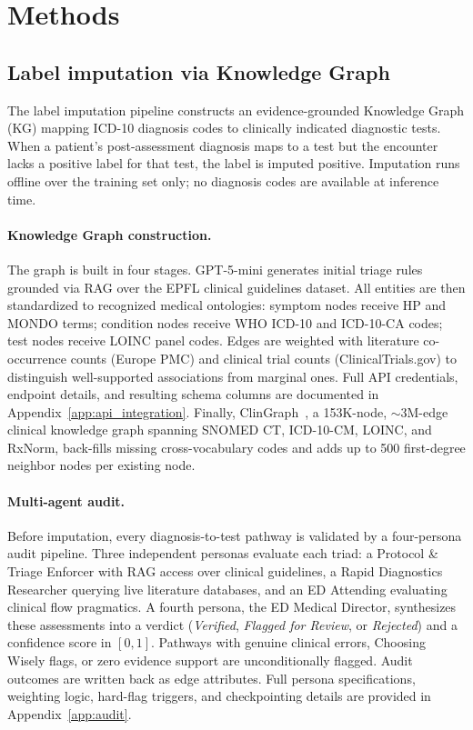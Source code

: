 \newpage
\section[Methods]{Methods\footnotemark}

\subsection{Label imputation via Knowledge Graph}

The label imputation pipeline constructs an evidence-grounded Knowledge Graph (KG) mapping ICD-10 diagnosis codes to clinically indicated diagnostic tests. When a patient's post-assessment diagnosis maps to a test but the encounter lacks a positive label for that test, the label is imputed positive. Imputation runs offline over the training set only; no diagnosis codes are available at inference time.

\paragraph{Knowledge Graph construction.}
The graph is built in four stages. GPT-5-mini generates initial triage rules grounded via RAG over the EPFL clinical guidelines dataset. All entities are then standardized to recognized medical ontologies: symptom nodes receive HP and MONDO terms; condition nodes receive WHO ICD-10 and ICD-10-CA codes; test nodes receive LOINC panel codes. Edges are weighted with literature co-occurrence counts (Europe PMC) and clinical trial counts (ClinicalTrials.gov) to distinguish well-supported associations from marginal ones. Full API credentials, endpoint details, and resulting schema columns are documented in Appendix~\ref{app:api_integration}. Finally, ClinGraph~\cite{johnson_clinvec_2024}, a 153K-node, ${\sim}$3M-edge clinical knowledge graph spanning SNOMED CT, ICD-10-CM, LOINC, and RxNorm, back-fills missing cross-vocabulary codes and adds up to 500 first-degree neighbor nodes per existing node.

\paragraph{Multi-agent audit.}
Before imputation, every diagnosis-to-test pathway is validated by a four-persona audit pipeline. Three independent personas evaluate each triad: a Protocol \& Triage Enforcer with RAG access over clinical guidelines, a Rapid Diagnostics Researcher querying live literature databases, and an ED Attending evaluating clinical flow pragmatics. A fourth persona, the ED Medical Director, synthesizes these assessments into a verdict (\textit{Verified}, \textit{Flagged for Review}, or \textit{Rejected}) and a confidence score in $[0, 1]$. Pathways with genuine clinical errors, Choosing Wisely flags, or zero evidence support are unconditionally flagged. Audit outcomes are written back as edge attributes. Full persona specifications, weighting logic, hard-flag triggers, and checkpointing details are provided in Appendix~\ref{app:audit}.

